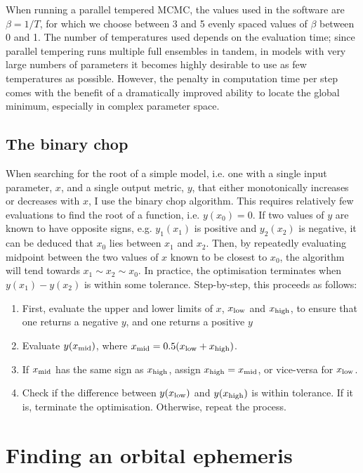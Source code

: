 When running a parallel tempered MCMC, the values used in the software are $\beta = 1/T$, for which we choose between 3 and 5 evenly spaced values of $\beta$ between 0 and 1.
The number of temperatures used depends on the evaluation time; since parallel tempering runs multiple full ensembles in tandem, in models with very large numbers of parameters it becomes highly desirable to use as few temperatures as possible. However, the penalty in computation time per step comes with the benefit of a dramatically improved ability to locate the global minimum, especially in complex parameter space.

\subsection{The binary chop}
\label{sect:modelling:binary chop methodology}

When searching for the root of a simple model, i.e. one with a single input parameter, $x$, and a single output metric, $y$, that either monotonically increases or decreases with $x$, I use the binary chop algorithm.
This requires relatively few evaluations to find the root of a function, i.e. $y(x_0) = 0$.
If two values of $y$ are known to have opposite signs, e.g. $y_1(x_1)$ is positive and $y_2(x_2)$ is negative, it can be deduced that $x_0$ lies between $x_1$ and $x_2$. Then, by repeatedly evaluating midpoint between the two values of $x$ known to be closest to $x_0$, the algorithm will tend towards $x_1 \sim x_2 \sim x_0$. In practice, the optimisation terminates when $y(x_1) - y(x_2)$ is within some tolerance.
Step-by-step, this proceeds as follows:
\begin{enumerate}
    \setlength\itemsep{0em}
    \item First, evaluate the upper and lower limits of $x$, $x_{\rm low}$ and $x_{\rm high}$, to ensure that one returns a negative $y$, and one returns a positive $y$
    \item Evaluate $y(x_{\rm mid})$, where $x_{\rm mid} = 0.5(x_{\rm low} + x_{\rm high})$.
    \item If $x_{\rm mid}$ has the same sign as $x_{\rm high}$, assign $x_{\rm high} = x_{\rm mid}$, or vice-versa for $x_{\rm low}$.
    \item Check if the difference between $y(x_{\rm low})$ and $y(x_{\rm high})$ is within tolerance. If it is, terminate the optimisation. Otherwise, repeat the process.
\end{enumerate}


\section{Finding an orbital ephemeris}
\label{sect:modelling:getting ephemeris}

